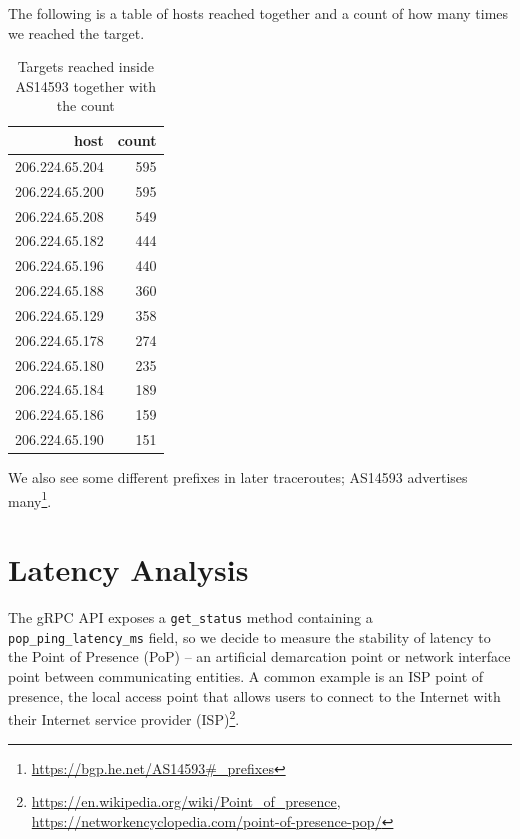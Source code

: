 \documentclass[IN,11pt,twoside,openright,idp,english]{tumthesis}
\begin{document}
The following is a table of hosts reached together and a count of how many times we reached the target.
    
\begin{table}
    \centering
    \begin{tabular}{ r r }
        \toprule
            host           & count \\ 
            \midrule
            206.224.65.204 & 595   \\
            206.224.65.200 & 595   \\
            206.224.65.208 & 549   \\ 
            206.224.65.182 & 444   \\
            206.224.65.196 & 440   \\ 
            206.224.65.188 & 360   \\ 
            206.224.65.129 & 358   \\ 
            206.224.65.178 & 274   \\ 
            206.224.65.180 & 235   \\ 
            206.224.65.184 & 189   \\ 
            206.224.65.186 & 159   \\ 
            206.224.65.190 & 151   \\
            \bottomrule
    \end{tabular}
    \caption{Targets reached inside AS14593 together with the count}
\end{table}

We also see some different prefixes in later traceroutes; AS14593 advertises many\footnote{\url{https://bgp.he.net/AS14593\#_prefixes}}.
    
\section{Latency Analysis}

The gRPC API exposes a \texttt{get\_status} method containing a \texttt{pop\_ping\_latency\_ms} field, so we decide to measure the stability of latency to the Point of Presence (PoP) -- an artificial demarcation point or network interface point between communicating entities. A common example is an ISP point of presence, the local access point that allows users to connect to the Internet with their Internet service provider (ISP)\footnote{\url{https://en.wikipedia.org/wiki/Point_of_presence}, \url{https://networkencyclopedia.com/point-of-presence-pop/}}.
\end{document}
